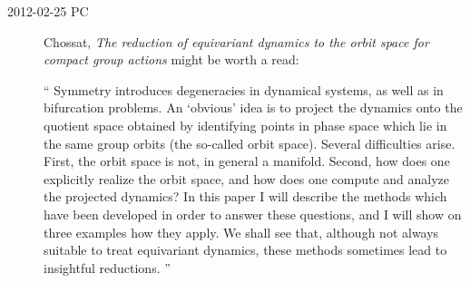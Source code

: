\begin{description}
\item[2012-02-25 PC]
Chossat,
{\em The reduction of equivariant dynamics to the
        orbit space for compact group actions}
might be worth a read:

``
Symmetry introduces degeneracies in dynamical systems, as well as in
bifurcation problems. An `obvious' idea is to project the dynamics onto
the quotient space obtained by identifying points in phase space which
lie in the same group orbits (the so-called orbit space). Several
difficulties arise. First, the orbit space is not, in general a manifold.
Second, how does one explicitly realize the orbit space, and how does one
compute and analyze the projected dynamics? In this paper I will describe
the methods which have been developed in order to answer these questions,
and I will show on three examples how they apply. We shall see that,
although not always suitable to treat equivariant dynamics, these methods
sometimes lead to insightful reductions.
''

\end{description}



\renewcommand{\ssp}{a}
